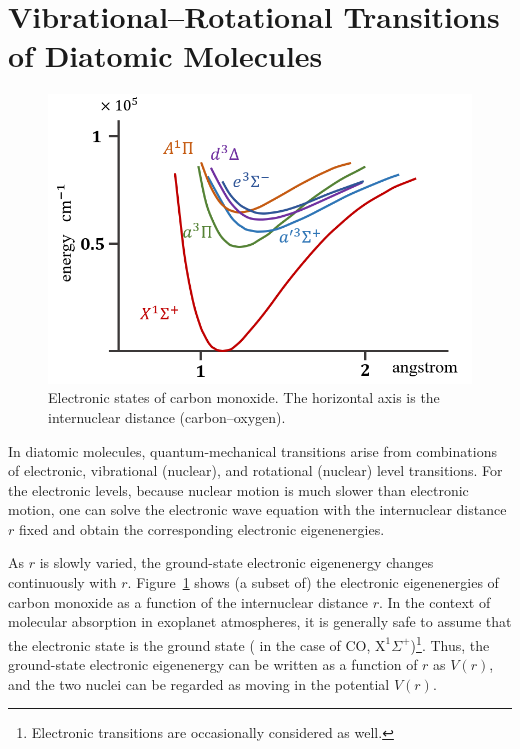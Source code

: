 \section{Vibrational–Rotational Transitions of Diatomic Molecules}

\begin{figure}[]
 \begin{center}
	\includegraphics[width=1.0\linewidth]{fig/co_ele_state.png}
\end{center}
\caption{Electronic states of carbon monoxide. The horizontal axis is the internuclear distance (carbon–oxygen).}
\label{fig:co_ele_state}
\end{figure} 

In diatomic molecules, quantum-mechanical transitions arise from combinations of electronic, vibrational (nuclear), and rotational (nuclear) level transitions. For the electronic levels, because nuclear motion is much slower than electronic motion, one can solve the electronic wave equation with the internuclear distance $r$ fixed and obtain the corresponding electronic eigenenergies.

As $r$ is slowly varied, the ground-state electronic eigenenergy changes continuously with $r$. Figure~\ref{fig:co_ele_state} shows (a subset of) the electronic eigenenergies of carbon monoxide as a function of the internuclear distance $r$. In the context of molecular absorption in exoplanet atmospheres, it is generally safe to assume that the electronic state is the ground state ( in the case of CO, $\mathrm{X^1}\Sigma^+$)\footnote{Electronic transitions are occasionally considered as well.}. Thus, the ground-state electronic eigenenergy can be written as a function of $r$ as $V(r)$, and the two nuclei can be regarded as moving in the potential $V(r)$.


